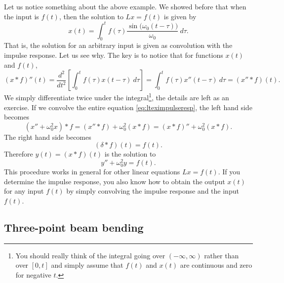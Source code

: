Let us notice something about the above example.  We showed before that
when the input is $f(t)$, then the solution to $Lx = f(t)$
is given by
\begin{equation*}
x(t) = 
\int_0^t
f(\tau) 
\frac{\sin \bigl( \omega_0 (t-\tau) \bigr)}{\omega_0} ~ d\tau .
\end{equation*}
That is, the solution for an arbitrary input is given as
convolution with the impulse response.  Let us see why.
The key is to notice that for functions $x(t)$ and $f(t)$,
\begin{equation*}
(x * f)''(t) =
\frac{d^2}{dt^2}\left[
\int_0^t
f(\tau) 
x(t-\tau) ~ d\tau \right]
=
\int_0^t
f(\tau) 
x''(t-\tau) ~ d\tau
= (x'' * f)(t) .
\end{equation*}
We simply differentiate twice under the
integral\footnote{You should really think of the integral going over
$(-\infty,\infty)$ rather than over $[0,t]$ and simply assume that $f(t)$ and
$x(t)$ are continuous and zero for negative $t$.}, the details are
left as an exercise.
If we convolve the entire equation \eqref{eq:lteximpulseresp},
the left hand side becomes
\begin{equation*}
(x'' + \omega_0^2 x) * f =
(x'' * f) + \omega_0^2 (x * f) =
(x * f)'' + \omega_0^2 (x * f) .
\end{equation*}
The right hand side becomes
\begin{equation*}
(\delta * f)(t) = f(t).
\end{equation*}
Therefore $y(t) = (x * f)(t)$ is the solution to
\begin{equation*}
y'' + \omega_0^2 y = f(t) .
\end{equation*}
This procedure works in general for other linear
equations $Lx = f(t)$.  If you determine the impulse response,
you also know how to obtain the output $x(t)$ for any input $f(t)$
by simply convolving
the impulse response and the input $f(t)$.

\subsection{Three-point beam bending}


